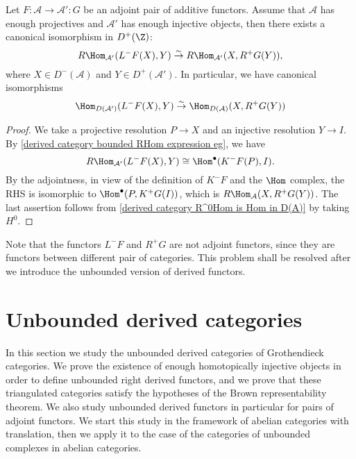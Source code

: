 \begin{proposition}\label{derived category bounded derived adjointness}
Let $F:\mathcal{A}\to\mathcal{A}':G$ be an adjoint pair of additive functors. Assume that $\mathcal{A}$ has enough projectives and $\mathcal{A}'$ has enough injective objects, then there exists a canonical isomorphism in $D^+(\Z)$:
\[R\Hom_{\mathcal{A}'}(L^-F(X),Y)\stackrel{\sim}{\to} R\Hom_{\mathcal{A}'}(X,R^+G(Y)),\]
where $X\in D^-(\mathcal{A})$ and $Y\in D^+(\mathcal{A}')$. In particular, we have canonical isomorphisms
\[\Hom_{D(\mathcal{A}')}(L^-F(X),Y)\stackrel{\sim}{\to} \Hom_{D(\mathcal{A})}(X,R^+G(Y))\]
\end{proposition}
\begin{proof}
We take a projective resolution $P\to X$ and an injective resolution $Y\to I$. By \cref{derived category bounded RHom expression eg}, we have
\[R\Hom_{\mathcal{A}'}(L^-F(X),Y)\cong \Hom^\bullet(K^-F(P),I).\]
By the adjointness, in view of the definition of $K^-F$ and the $\Hom$ complex, the RHS is isomorphic to $\Hom^\bullet(P,K^+G(I))$, which is $R\Hom_\mathcal{A}(X,R^+G(Y))$. The last assertion follows from \cref{derived category R^0Hom is Hom in D(A)} by taking $H^0$.
\end{proof}
Note that the functors $L^-F$ and $R^+G$ are not adjoint functors, since they are functors between different pair of categories. This problem shall be resolved after we introduce the unbounded version of derived functors.

\section{Unbounded derived categories}
In this section we study the unbounded derived categories of Grothendieck categories. We prove the existence of enough homotopically injective objects in order to define unbounded right derived functors, and we prove that these triangulated categories satisfy the hypotheses of the Brown representability theorem. We also study unbounded derived functors in particular for pairs of adjoint functors. We start this study in the framework of abelian categories with translation, then we apply it to the case of the categories of unbounded complexes in abelian categories.


